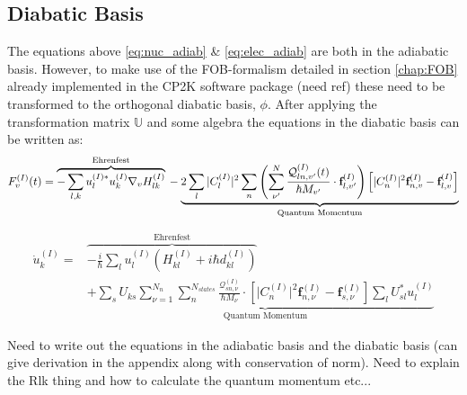 \subsection{Diabatic Basis}
The equations above \eqref{eq:nuc_adiab} \& \eqref{eq:elec_adiab} are both in the adiabatic basis. However, to make use of the FOB-formalism detailed in section \ref{chap:FOB} already implemented in the CP2K software package (need ref) these need to be transformed to the orthogonal diabatic basis, $\phi$. After applying the transformation matrix $\mathbb{U}$ and some algebra the equations in the diabatic basis can be written as:
\begin{dmath*}
{ F_{v}^{(I)}(t)} =
\overbrace{ -\sum_{l,k} u_{l}^{(I) *} u_{k}^{(I)} \nabla_{v} H_{lk}^{(I)}}^{\text{Ehrenfest}}
\\
 - \underbrace{2 \sum_{l} |C_{l}^{(I)}|^2 \sum_{n} \left( \sum^{N}_{\nu'} \frac{\mathcal{Q}^{(I)}_{ln,v'}(t)}{\hbar M_{v'}} \cdot \textbf{f}^{(I)}_{l,v'}\right)\left[  |C_{n}^{(I)}|^{2} \textbf{f}^{(I)}_{n,v} - \textbf{f}^{(I)}_{l,v} \right]}_{\text{Quantum Momentum}}
\end{dmath*}

\begin{align*}
\dot{u}_k^{(I)} =
&\overbrace{ - \frac{i}{\hbar}\sum\limits_{l} u_l^{(I)} \left(H_{kl}^{(I)} + i \hbar d_{kl}^{(I)} \right)}^{\text{Ehrenfest}} \\
& + \underbrace{\sum_{s} U_{ks} \sum_{\nu = 1}^{N_n}\sum_{n}^{N_{states}}  \frac{\mathcal{Q}_{sn,\nu}^{(I)}}{\hbar M_\nu}\cdot \left[\vert C_n^{(I)} \vert^2 \mathbf{f}_{n, \nu}^{(I)}- \mathbf{f}^{(I)}_{s, \nu}\right] \sum_{l} U^{*}_{sl} u^{(I)}_{l}}_{\text{Quantum Momentum}}
\end{align*}


{\Large Need to write out the equations in the adiabatic basis and the diabatic basis (can give derivation in the appendix along with conservation of norm). Need to explain the Rlk thing and how to calculate the quantum momentum etc... }

